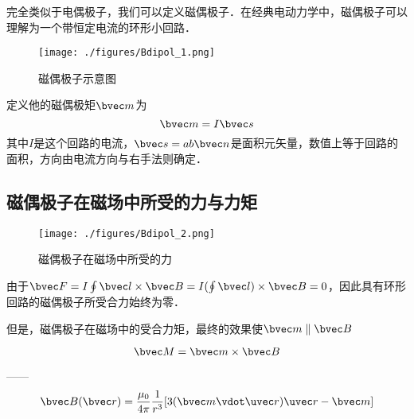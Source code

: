
\begin{issues}
\issueDraft
\end{issues}
完全类似于电偶极子，我们可以定义磁偶极子．在经典电动力学中，磁偶极子可以理解为一个带恒定电流的环形小回路．
\begin{figure}[ht]
\centering
\texttt{[image: ./figures/Bdipol\_1.png]}
\caption{磁偶极子示意图} \label{Bdipol_fig1}
\end{figure}

定义他的磁偶极矩$\bvec m$为
\begin{equation}
\bvec m = I \bvec s
\end{equation}
其中$I$是这个回路的电流，$\bvec s = ab\bvec n$是面积元矢量，数值上等于回路的面积，方向由电流方向与右手法则确定．

\subsection{磁偶极子在磁场中所受的力与力矩}
\begin{figure}[ht]
\centering
\texttt{[image: ./figures/Bdipol\_2.png]}
\caption{磁偶极子在磁场中所受的力} \label{Bdipol_fig2}
\end{figure}
由于$\bvec F = I \oint \bvec l \times \bvec B = I (\oint \bvec l) \times \bvec B = 0$，因此具有环形回路的磁偶极子所受合力始终为零．

但是，磁偶极子在磁场中的受合力矩，最终的效果使$\bvec m \parallel \bvec B$

\begin{equation}
\bvec M = \bvec m \times \bvec B
\end{equation}

------
\begin{equation}
\bvec B(\bvec r) = \frac{\mu_0}{4\pi} \frac{1}{r^3} [3(\bvec m \vdot \uvec r) \uvec r - \bvec m]
\end{equation}
